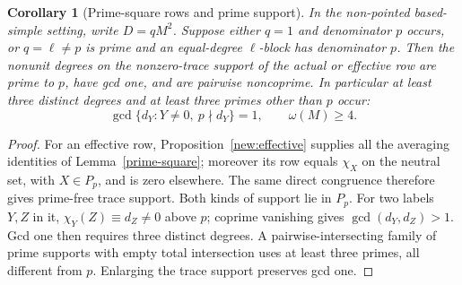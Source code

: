 \documentclass[11pt]{amsart}
\numberwithin{equation}{section}
\newtheorem{corollary}[theorem]{Corollary}
\theoremstyle{definition}
\theoremstyle{plain}
\begin{document}
\begin{corollary}[Prime-square rows and prime support]
\label{new:prime-free-square-trace}
In the non-pointed based-simple setting, write $D=qM^2$.
Suppose either $q=1$ and denominator $p$ occurs, or
$q=\ell\ne p$ is prime and an equal-degree $\ell$-block has
denominator $p$. Then the nonunit degrees on the nonzero-trace
support of the actual or effective row are prime to $p$, have
gcd one, and are pairwise noncoprime. In particular at least three
distinct degrees and at least three primes other than $p$ occur:
\[
 \gcd\{d_Y:Y\ne0,\ p\nmid d_Y\}=1,\qquad \omega(M)\ge4.
\]
\end{corollary}
\begin{proof}
For an effective row, Proposition~\ref{new:effective} supplies all
the averaging identities of Lemma~\ref{prime-square}; moreover its
row equals $\chi_X$ on the neutral set, with $X\in P_p$, and is
zero elsewhere. The same direct congruence therefore gives prime-free
trace support. Both kinds of support lie in $P_p$. For two labels
$Y,Z$ in it, $\chi_Y(Z)\equiv d_Z\ne0$ above $p$; coprime
vanishing gives $\gcd(d_Y,d_Z)>1$. Gcd one then requires three
distinct degrees. A pairwise-intersecting family of prime supports
with empty total intersection uses at least three primes, all different
from $p$. Enlarging the trace support preserves gcd one.
\end{proof}
\end{document}
